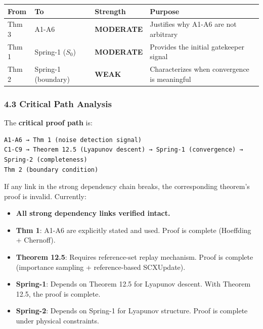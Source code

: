 \documentclass[
  12pt,
]{article}
\providecommand{\tightlist}{%
  \setlength{\itemsep}{0pt}\setlength{\parskip}{0pt}}
\begin{document}
\begin{longtable}[]{@{}
  >{\raggedright\arraybackslash}p{}
  >{\raggedright\arraybackslash}p{}
  >{\raggedright\arraybackslash}p{}
  >{\raggedright\arraybackslash}p{}@{}}
\toprule\noalign{}
\begin{minipage}[b]{\linewidth}\raggedright
From
\end{minipage} & \begin{minipage}[b]{\linewidth}\raggedright
To
\end{minipage} & \begin{minipage}[b]{\linewidth}\raggedright
Strength
\end{minipage} & \begin{minipage}[b]{\linewidth}\raggedright
Purpose
\end{minipage} \\
\midrule\noalign{}
\endhead
\bottomrule\noalign{}
\endlastfoot
Thm 3 & A1-A6 & \textbf{MODERATE} & Justifies why A1-A6 are not
arbitrary \\
Thm 1 & Spring-1 (\(S_0\)) & \textbf{MODERATE} & Provides the initial
gatekeeper signal \\
Thm 2 & Spring-1 (boundary) & \textbf{WEAK} & Characterizes when
convergence is meaningful \\
\end{longtable}

\subsubsection{4.3 Critical Path Analysis}\label{critical-path-analysis}

The \textbf{critical proof path} is:

\begin{verbatim}
A1-A6 → Thm 1 (noise detection signal)
C1-C9 → Theorem 12.5 (Lyapunov descent) → Spring-1 (convergence) → Spring-2 (completeness)
Thm 2 (boundary condition)
\end{verbatim}

If any link in the strong dependency chain breaks, the corresponding
theorem's proof is invalid. Currently:

\begin{itemize}
\tightlist
\item
  \textbf{All strong dependency links verified intact.}
\item
  \textbf{Thm 1}: A1-A6 are explicitly stated and used. Proof is
  complete (Hoeffding + Chernoff).
\item
  \textbf{Theorem 12.5}: Requires reference-set replay mechanism. Proof
  is complete (importance sampling + reference-based SCXUpdate).
\item
  \textbf{Spring-1}: Depends on Theorem 12.5 for Lyapunov descent. With
  Theorem 12.5, the proof is complete.
\item
  \textbf{Spring-2}: Depends on Spring-1 for Lyapunov structure. Proof
  is complete under physical constraints.
\end{itemize}
\end{document}
